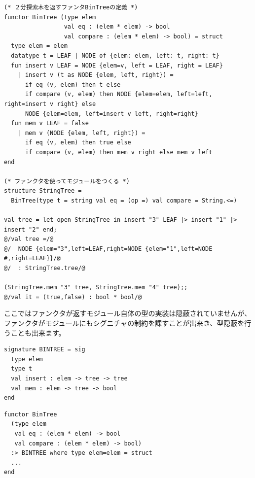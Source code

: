 \documentclass[11pt,a4paper]{jarticle}
\begin{document}
\begin{lstlisting}[caption=ファンクタの例]
(* ２分探索木を返すファンタBinTreeの定義 *)
functor BinTree (type elem
                 val eq : (elem * elem) -> bool
                 val compare : (elem * elem) -> bool) = struct
  type elem = elem
  datatype t = LEAF | NODE of {elem: elem, left: t, right: t}
  fun insert v LEAF = NODE {elem=v, left = LEAF, right = LEAF}
    | insert v (t as NODE {elem, left, right}) =
      if eq (v, elem) then t else
      if compare (v, elem) then NODE {elem=elem, left=left, right=insert v right} else
      NODE {elem=elem, left=insert v left, right=right}
  fun mem v LEAF = false
    | mem v (NODE {elem, left, right}) =
      if eq (v, elem) then true else
      if compare (v, elem) then mem v right else mem v left
end

(* ファンクタを使ってモジュールをつくる *)
structure StringTree =
  BinTree(type t = string val eq = (op =) val compare = String.<=)

val tree = let open StringTree in insert "3" LEAF |> insert "1" |> insert "2" end;
@/val tree =/@
@/  NODE {elem="3",left=LEAF,right=NODE {elem="1",left=NODE #,right=LEAF}}/@
@/  : StringTree.tree/@

(StringTree.mem "3" tree, StringTree.mem "4" tree);;
@/val it = (true,false) : bool * bool/@
\end{lstlisting}

ここではファンクタが返すモジュール自体の型の実装は隠蔽されていませんが、
ファンクタがモジュールにもシグニチャの制約を課すことが出来き、型隠蔽を行うことも出来ます。

\begin{minipage}[htb]{0.45\textwidth}
\begin{lstlisting}[caption=２分木のシグニチャ]
signature BINTREE = sig
  type elem
  type t
  val insert : elem -> tree -> tree
  val mem : elem -> tree -> bool
end
\end{lstlisting}
\end{minipage}
\hfill
\begin{minipage}[htb]{0.55\textwidth}
\begin{lstlisting}[caption=BinTreeの再定義,label=code:bin-tree-with-sig]
functor BinTree
  (type elem
   val eq : (elem * elem) -> bool
   val compare : (elem * elem) -> bool)
  :> BINTREE where type elem=elem = struct
  ...
end
\end{lstlisting}
\end{minipage}
\end{document}

